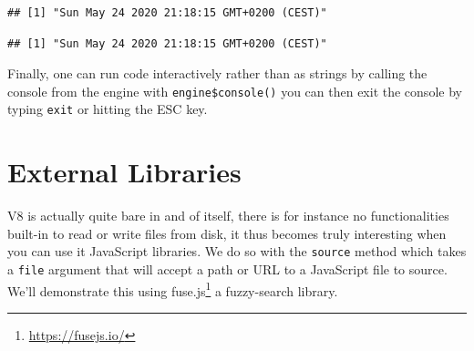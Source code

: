 \documentclass[
]{krantz}
\makeatletter
\newenvironment{Shaded}{\begin{snugshade}}{\end{snugshade}}
\newcommand{\CommentTok}[1]{\textcolor[rgb]{0.37,0.37,0.37}{\textit{#1}}}
\newcommand{\KeywordTok}[1]{\textcolor[rgb]{0.27,0.27,0.27}{\textbf{#1}}}
\newcommand{\NormalTok}[1]{#1}
\newcommand{\OperatorTok}[1]{\textcolor[rgb]{0.43,0.43,0.43}{\textbf{#1}}}
\newcommand{\StringTok}[1]{\textcolor[rgb]{0.5,0.5,0.5}{#1}}
\renewcommand{\href}[2]{#2\footnote{\url{#1}}}
\newenvironment{kframe}{%
\medskip{}
\setlength{\fboxsep}{.8em}
 \def\at@end@of@kframe{}%
 \ifinner\ifhmode%
  \def\at@end@of@kframe{\end{minipage}}%
  \begin{minipage}{\columnwidth}%
 \fi\fi%
 \def\FrameCommand##1{\hskip\@totalleftmargin \hskip-\fboxsep
 \colorbox{shadecolor}{##1}\hskip-\fboxsep
     \hskip-\linewidth \hskip-\@totalleftmargin \hskip\columnwidth}%
 \MakeFramed {\advance\hsize-\width
   \@totalleftmargin\z@ \linewidth\hsize
   \@setminipage}}%
 {\par\unskip\endMakeFramed%
 \at@end@of@kframe}
\renewenvironment{Shaded}{\begin{kframe}}{\end{kframe}}
\makeatother
\begin{document}
\begin{Shaded}
\end{Shaded}

\begin{verbatim}
## [1] "Sun May 24 2020 21:18:15 GMT+0200 (CEST)"
\end{verbatim}

\begin{Shaded}
\end{Shaded}

\begin{verbatim}
## [1] "Sun May 24 2020 21:18:15 GMT+0200 (CEST)"
\end{verbatim}

Finally, one can run code interactively rather than as strings by calling the console from the engine with \texttt{engine\$console()} you can then exit the console by typing \texttt{exit} or hitting the ESC key.

\hypertarget{external-libraries}{%
\section*{External Libraries}\label{external-libraries}}


V8 is actually quite bare in and of itself, there is for instance no functionalities built-in to read or write files from disk, it thus becomes truly interesting when you can use it JavaScript libraries. We do so with the \texttt{source} method which takes a \texttt{file} argument that will accept a path or URL to a JavaScript file to source. We'll demonstrate this using \href{https://fusejs.io/}{fuse.js} a fuzzy-search library.

\begin{Shaded}
\end{Shaded}
\end{document}
